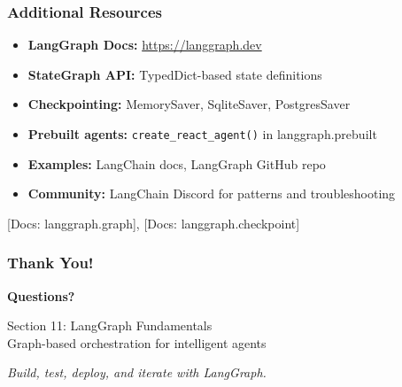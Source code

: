 \documentclass[aspectratio=169,11pt]{beamer}
\newcommand{\docref}[1]{{\scriptsize\color{docgray}[Docs: #1]}}
\begin{document}
\begin{frame}
\frametitle{Additional Resources}
\begin{itemize}
    \setlength{\itemsep}{1pt}
  \item \textbf{LangGraph Docs:} \url{https://langgraph.dev}
  \item \textbf{StateGraph API:} TypedDict-based state definitions
  \item \textbf{Checkpointing:} MemorySaver, SqliteSaver, PostgresSaver
  \item \textbf{Prebuilt agents:} \texttt{create\_react\_agent()} in langgraph.prebuilt
  \item \textbf{Examples:} LangChain docs, LangGraph GitHub repo
  \item \textbf{Community:} LangChain Discord for patterns and troubleshooting
\end{itemize}

\vspace{20pt}
\docref{langgraph.graph}, \docref{langgraph.checkpoint}
\end{frame}

\begin{frame}
\frametitle{Thank You!}
\begin{center}
\Large
\textbf{Questions?}

\vspace{30pt}
\normalsize
Section 11: LangGraph Fundamentals \\
Graph-based orchestration for intelligent agents

\vspace{20pt}
\textit{Build, test, deploy, and iterate with LangGraph.}
\end{center}
\end{frame}
\end{document}
